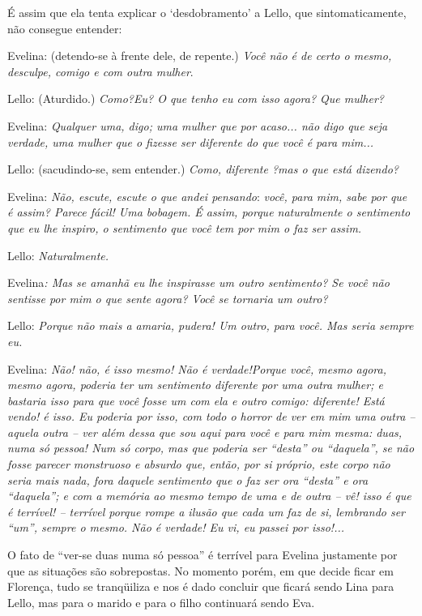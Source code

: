 É assim que ela tenta explicar o `desdobramento' a Lello, que
sintomaticamente, não consegue entender:

Evelina: (detendo-se à frente dele, de repente.) \emph{Você não é de
certo o mesmo, desculpe, comigo e com outra mulher}.

Lello: (Aturdido.) \emph{Como?Eu? O que tenho eu com isso agora? Que
mulher?}

Evelina: \emph{Qualquer uma, digo; uma mulher que por acaso... não digo
que seja verdade, uma mulher que o fizesse ser diferente do que você é
para mim...}

Lello: (sacudindo-se, sem entender.) \emph{Como, diferente ?mas o que
está dizendo?}

Evelina: \emph{Não, escute, escute o que andei pensando}: \emph{você,
para mim, sabe por que é assim? Parece fácil! Uma bobagem. É assim,
porque naturalmente o sentimento que eu lhe inspiro, o sentimento que
você tem por mim o faz ser assim. }

Lello: \emph{Naturalmente.}

Evelina\emph{: Mas se amanhã eu lhe inspirasse um outro sentimento? Se
você não sentisse por mim o que sente agora? Você se tornaria um outro?}

Lello: \emph{Porque não mais a amaria, pudera! Um outro, para você. Mas
seria sempre eu. }

Evelina: \emph{Não! não, é isso mesmo! Não é verdade!Porque você, mesmo
agora, mesmo agora, poderia ter um sentimento diferente por uma outra
mulher; e bastaria isso para que você fosse um com ela e outro comigo:
diferente! Está vendo! é isso. Eu poderia por isso, com todo o horror de
ver em mim uma outra -- aquela outra -- ver além dessa que sou aqui para
você e para mim mesma: duas, numa só pessoa! Num só corpo, mas que
poderia ser ``desta'' ou ``daquela'', se não fosse parecer}
\emph{monstruoso e absurdo que, então, por si próprio, este corpo não
seria mais nada, fora daquele sentimento que o faz ser ora ``desta'' e
ora ``daquela''; e com a memória ao mesmo tempo de uma e de outra -- vê!
isso é que é terrível! -- terrível porque rompe a ilusão que cada um faz
de si, lembrando ser ``um'', sempre o mesmo. Não é verdade! Eu vi, eu
passei por isso!...}

O fato de ``ver-se duas numa só pessoa'' é terrível para Evelina
justamente por que as situações são sobrepostas. No momento porém, em
que decide ficar em Florença, tudo se tranqüiliza e nos é dado concluir
que ficará sendo Lina para Lello, mas para o marido e para o filho
continuará sendo Eva.


